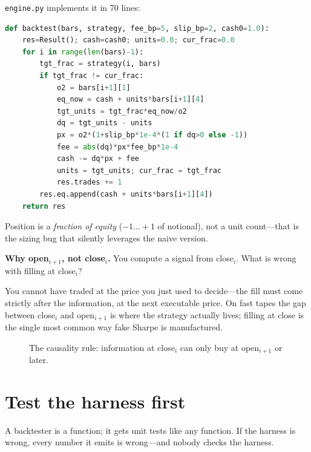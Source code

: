 \texttt{engine.py} implements it in 70 lines:
\begin{lstlisting}[language=Python, numbers=none]
def backtest(bars, strategy, fee_bp=5, slip_bp=2, cash0=1.0):
    res=Result(); cash=cash0; units=0.0; cur_frac=0.0
    for i in range(len(bars)-1):
        tgt_frac = strategy(i, bars)
        if tgt_frac != cur_frac:
            o2 = bars[i+1][1]
            eq_now = cash + units*bars[i+1][4]
            tgt_units = tgt_frac*eq_now/o2
            dq = tgt_units - units
            px = o2*(1+slip_bp*1e-4*(1 if dq>0 else -1))
            fee = abs(dq)*px*fee_bp*1e-4
            cash -= dq*px + fee
            units = tgt_units; cur_frac = tgt_frac
            res.trades += 1
        res.eq.append(cash + units*bars[i+1][4])
    return res
\end{lstlisting}
Position is a \emph{fraction of equity} ($-1\ldots+1$ of notional), not a unit count---that
is the sizing bug that silently leverages the naive version.

\begin{example}\label{ex:fillrule}
\textbf{Why open$_{i+1}$, not close$_i$.} You compute a signal from close$_i$. What is wrong
with filling at close$_i$?
\begin{solution}
You cannot have traded at the price you just used to decide---the fill must come strictly
after the information, at the next executable price. On fast tapes the gap between close$_i$
and open$_{i+1}$ is where the strategy actually lives; filling at close is the single most
common way fake Sharpe is manufactured.
\end{solution}
\end{example}

\begin{figure}[htbp]\centering

\caption{The causality rule: information at close$_i$ can only buy at open$_{i+1}$ or later.}
\label{fig:fillrule}
\end{figure}

\section{Test the harness first}\label{sec:testharness}

A backtester is a function; it gets unit tests like any function. If the harness is wrong,
every number it emits is wrong---and nobody checks the harness.

